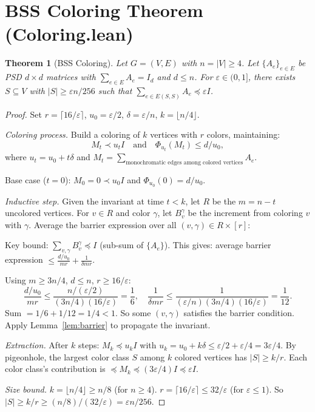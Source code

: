 \documentclass{article}
\newtheorem{theorem}{Theorem}
\theoremstyle{definition}
\begin{document}
\section{BSS Coloring Theorem (Coloring.lean)}

\begin{theorem}[BSS Coloring]\label{thm:bss}
Let $G = (V,E)$ with $n = |V| \ge 4$. Let $\{A_e\}_{e \in E}$ be PSD $d \times d$
matrices with $\sum_{e \in E} A_e = I_d$ and $d \le n$. For $\varepsilon \in (0,1]$,
there exists $S \subseteq V$ with $|S| \ge \varepsilon n / 256$ such that
$\sum_{e \in E(S,S)} A_e \preceq \varepsilon I$.
\end{theorem}

\begin{proof}
Set $r = \lceil 16/\varepsilon \rceil$, $u_0 = \varepsilon/2$, $\delta = \varepsilon/n$,
$k = \lfloor n/4 \rfloor$.

\emph{Coloring process.} Build a coloring of $k$ vertices with $r$ colors, maintaining:
\begin{equation}\label{eq:invariant}
M_t \prec u_t I \quad\text{and}\quad \Phi_{u_t}(M_t) \le d/u_0,
\end{equation}
where $u_t = u_0 + t\delta$ and $M_t = \sum_{\text{monochromatic edges among colored vertices}} A_e$.

Base case ($t = 0$): $M_0 = 0 \prec u_0 I$ and $\Phi_{u_0}(0) = d/u_0$. \checkmark

\emph{Inductive step.} Given the invariant at time $t < k$, let $R$ be the $m = n - t$
uncolored vertices. For $v \in R$ and color $\gamma$, let $B_v^\gamma$ be the increment
from coloring $v$ with $\gamma$. Average the barrier expression over all $(v,\gamma) \in R \times [r]$:

Key bound: $\sum_{v,\gamma} B_v^\gamma \preceq I$ (sub-sum of $\{A_e\}$).
This gives: average barrier expression $\le \frac{d/u_0}{mr} + \frac{1}{\delta m r}$.

Using $m \ge 3n/4$, $d \le n$, $r \ge 16/\varepsilon$:
\[
  \frac{d/u_0}{mr} \le \frac{n/(\varepsilon/2)}{(3n/4)(16/\varepsilon)} = \frac{1}{6}, \quad
  \frac{1}{\delta mr} \le \frac{1}{(\varepsilon/n)(3n/4)(16/\varepsilon)} = \frac{1}{12}.
\]
Sum $= 1/6 + 1/12 = 1/4 < 1$. So some $(v,\gamma)$ satisfies the barrier condition.
Apply Lemma~\ref{lem:barrier} to propagate the invariant.

\emph{Extraction.} After $k$ steps: $M_k \preceq u_k I$ with
$u_k = u_0 + k\delta \le \varepsilon/2 + \varepsilon/4 = 3\varepsilon/4$.
By pigeonhole, the largest color class $S$ among $k$ colored vertices has
$|S| \ge k/r$. Each color class's contribution is $\preceq M_k \preceq (3\varepsilon/4)I \preceq \varepsilon I$.

\emph{Size bound.}
$k = \lfloor n/4 \rfloor \ge n/8$ (for $n \ge 4$).
$r = \lceil 16/\varepsilon \rceil \le 32/\varepsilon$ (for $\varepsilon \le 1$).
So $|S| \ge k/r \ge (n/8)/(32/\varepsilon) = \varepsilon n / 256$.
\end{proof}
\end{document}
